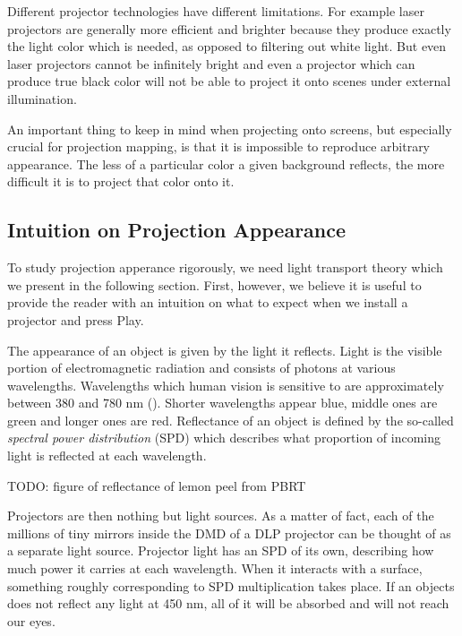 Different projector technologies have different limitations. For example laser projectors are generally more efficient and brighter because they produce exactly the light color which is needed, as opposed to filtering out white light. But even laser projectors cannot be infinitely bright and even a projector which can produce true black color will not be able to project it onto scenes under external illumination.

An important thing to keep in mind when projecting onto screens, but especially crucial for projection mapping, is that it is impossible to reproduce arbitrary appearance. The less of a particular color a given background reflects, the more difficult it is to project that color onto it.

\subsection{Intuition on Projection Appearance}
\label{section:background-projection_mapping-projection_intuition}

To study projection apperance rigorously, we need light transport theory which we present in the following section. First, however, we believe it is useful to provide the reader with an intuition on what to expect when we install a projector and press Play.

The appearance of an object is given by the light it reflects. Light is the visible portion of electromagnetic radiation and consists of photons at various wavelengths. Wavelengths which human vision is sensitive to are approximately between 380 and 780 nm (\citet{PBRT3e}). Shorter wavelengths appear blue, middle ones are green and longer ones are red. Reflectance of an object is defined by the so-called \textit{spectral power distribution} (SPD) which describes what proportion of incoming light is reflected at each wavelength.

{\color{red} TODO: figure of reflectance of lemon peel from PBRT}

Projectors are then nothing but light sources. As a matter of fact, each of the millions of tiny mirrors inside the DMD of a DLP projector can be thought of as a separate light source. Projector light has an SPD of its own, describing how much power it carries at each wavelength. When it interacts with a surface, something roughly corresponding to SPD multiplication takes place. If an objects does not reflect any light at 450 nm, all of it will be absorbed and will not reach our eyes.

